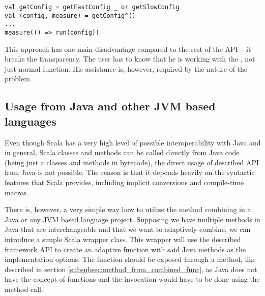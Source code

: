 \lstset{style=Scala}
\begin{lstlisting}
val getConfig = getFastConfig _ or getSlowConfig
val (config, measure) = getConfig^()
...
measure(() => run(config))
\end{lstlisting}

This approach has one main disadvantage compared to the rest of the API -- it breaks the transparency. The user has to know that he is working with the , not just normal function. His assistance is, however, required by the nature of the problem.


\subsection{Usage from Java and other JVM based languages}
\label{subsec:usage_from_java}

Even though Scala has a very high level of possible interoperability with Java and in general, Scala classes and methods can be called directly from Java code (being just a classes and methods in bytecode), the direct usage of described API from Java is not possible. The reason is that it depends heavily on the syntactic features that Scala provides, including implicit conversions and compile-time macros.

There is, however, a very simple way how to utilize the method combining in a Java or any JVM based language project. Supposing we have multiple methods in Java that are interchangeable and that we want to adaptively combine, we can introduce a simple Scala wrapper class. This wrapper will use the described framework API to create an adaptive function with said Java methods as the implementation options. The function should be exposed through a method, like described in section \ref{subsubsec:method_from_combined_func}, as Java does not have the concept of functions and the invocation would have to be done using the  method call.

